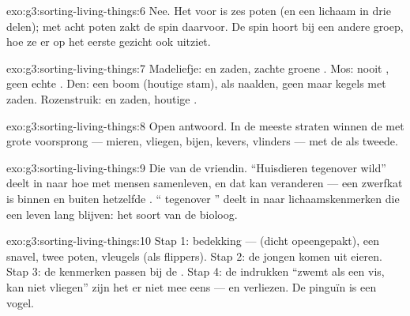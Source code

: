 \begin{solution}{exo:g3:sorting-living-things:6}
Nee. Het  voor  is zes poten (en een lichaam in drie
delen); met acht poten zakt de spin daarvoor. De spin hoort bij een
andere groep, hoe ze er op het eerste gezicht ook uitziet.
\end{solution}

\begin{solution}{exo:g3:sorting-living-things:7}
Madeliefje:  en zaden, zachte groene . Mos: nooit
, geen echte . Den: een boom (houtige stam),  als
naalden, geen  maar kegels met zaden. Rozenstruik:  en
zaden, houtige .
\end{solution}

\begin{solution}{exo:g3:sorting-living-things:8}
Open antwoord. In de meeste straten winnen de  met grote
voorsprong --- mieren, vliegen, bijen, kevers, vlinders --- met de
 als tweede.
\end{solution}

\begin{solution}{exo:g3:sorting-living-things:9}
Die van de vriendin. ``Huisdieren tegenover wild'' deelt in naar hoe
 met mensen samenleven, en dat kan veranderen --- een zwerfkat is
binnen en buiten hetzelfde . `` tegenover '' deelt
in naar lichaamskenmerken die een leven lang blijven: het soort
 van de bioloog.
\end{solution}

\begin{solution}{exo:g3:sorting-living-things:10}
Stap 1: bedekking ---  (dicht opeengepakt), een snavel, twee
poten, vleugels (als flippers). Stap 2: de jongen komen uit eieren.
Stap 3: de kenmerken passen bij de . Stap 4: de indrukken ``zwemt
als een vis, kan niet vliegen'' zijn het er niet mee eens --- en
verliezen. De pinguïn is een vogel.
\end{solution}
